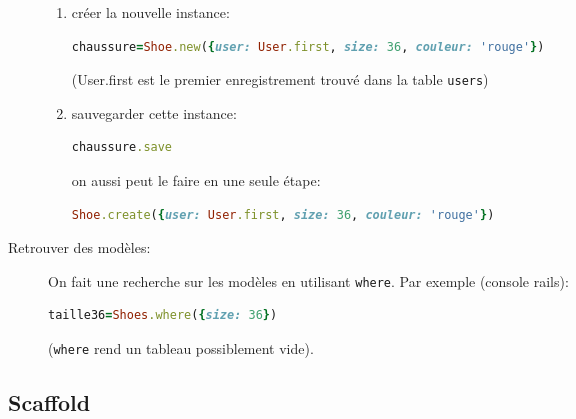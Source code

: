 \documentclass{article}
\begin{document}
\begin{description}
\begin{enumerate}
  \item créer la nouvelle instance:
    \begin{lstlisting}[language=ruby]
chaussure=Shoe.new({user: User.first, size: 36, couleur: 'rouge'})
    \end{lstlisting} 
    (User.first est le premier enregistrement trouvé dans la table
    \texttt{users})
  \item sauvegarder cette instance:
    \begin{lstlisting}[language=ruby]
chaussure.save
    \end{lstlisting} 
    on aussi peut le faire en une seule étape:
    \begin{lstlisting}[language=ruby]
      Shoe.create({user: User.first, size: 36, couleur: 'rouge'})
    \end{lstlisting}
  \end{enumerate}
\item[Retrouver des modèles:] On fait une recherche sur les modèles en
  utilisant \texttt{where}. Par exemple (console rails):
  \begin{lstlisting}[language=ruby]
    taille36=Shoes.where({size: 36}) 
  \end{lstlisting}
  (\texttt{where} rend un tableau possiblement vide). 
\end{description}

\subsection{Scaffold}
\end{document}
